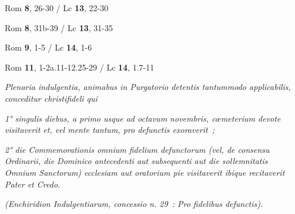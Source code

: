 {{\item[Feria IV] Rom \textbf{8}, 26-30 / Lc \textbf{13}, 22-30
\item[Feria V] Rom \textbf{8}, 31b-39 / Lc \textbf{13}, 31-35
\item[Feria VI] Rom \textbf{9}, 1-5 / Lc \textbf{14}, 1-6
\item[Sabbato] Rom \textbf{11}, 1-2a.11-12.25-29 / Lc \textbf{14}, 1.7-11}
\medskip
\textit{Plenaria indulgentia, animabus in Purgatorio detentis tantummodo applicabilis, conceditur christifideli qui}\par \textit{1° singulis diebus, a primo usque ad octavum novembris, cœmeterium devote visitaverit et, vel mente tantum, pro defunctis exoraverit~;}\par \textit{2° die Commemorationis omnium fidelium defunctorum (vel, de consensu Ordinarii, die Dominico antecedenti aut subsequenti aut die sollemnitatis Omnium Sanctorum) ecclesiam aut oratorium pie visitaverit ibique recitaverit \emph{Pater} et \emph{Credo}.}\begin{flushright}\textit{(Enchiridion Indulgentiarum, concessio n. 29~: Pro fidelibus defunctis).}\end{flushright}

}
